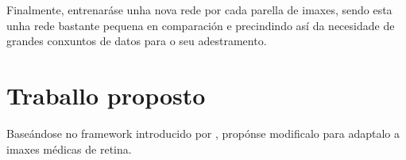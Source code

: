 Finalmente, entrenaráse unha nova rede por cada parella de imaxes, sendo esta unha rede bastante pequena en comparación e precindindo así da necesidade de grandes conxuntos de datos para o seu adestramento.



\section{Traballo proposto}
\label{sec:Traballo proposto}

Baseándose no framework introducido por \cite{wolterink2021implicit},
 propónse modificalo para adaptalo a imaxes médicas de retina.
